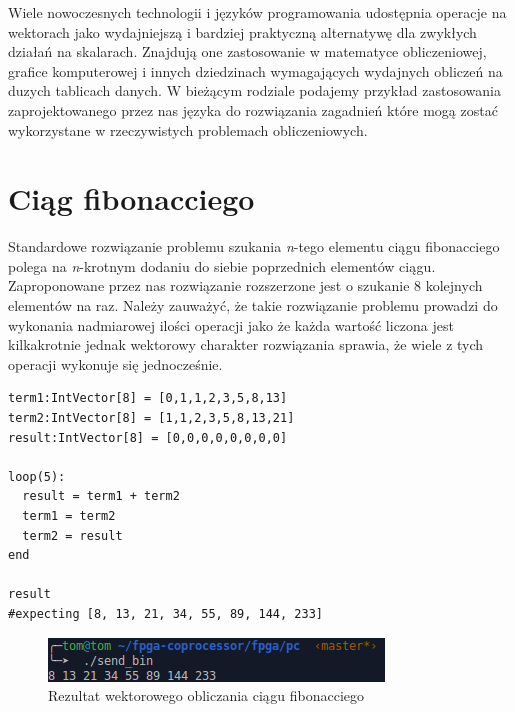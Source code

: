 Wiele nowoczesnych technologii i języków programowania udostępnia operacje na wektorach jako wydajniejszą i bardziej praktyczną alternatywę dla zwykłych działań na skalarach. Znajdują one zastosowanie w matematyce obliczeniowej, grafice komputerowej i innych dziedzinach wymagających wydajnych obliczeń na duzych tablicach danych. W bieżącym rodziale podajemy przykład zastosowania zaprojektowanego przez nas języka do rozwiązania zagadnień które mogą zostać wykorzystane w rzeczywistych problemach obliczeniowych.
\section{Ciąg fibonacciego}
Standardowe rozwiązanie problemu szukania \textit{n}-tego elementu ciągu fibonacciego polega na \textit{n}-krotnym dodaniu do siebie poprzednich elementów ciągu. Zaproponowane przez nas rozwiązanie rozszerzone jest o szukanie 8 kolejnych elementów na raz. Należy zauważyć, że takie rozwiązanie problemu prowadzi do wykonania nadmiarowej ilości operacji jako że każda wartość liczona jest kilkakrotnie jednak wektorowy charakter rozwiązania sprawia, że wiele z tych operacji wykonuje się jednocześnie.
\begin{lstlisting}[frame=single]
term1:IntVector[8] = [0,1,1,2,3,5,8,13]
term2:IntVector[8] = [1,1,2,3,5,8,13,21]
result:IntVector[8] = [0,0,0,0,0,0,0,0]

loop(5):
  result = term1 + term2
  term1 = term2
  term2 = result
end

result
#expecting [8, 13, 21, 34, 55, 89, 144, 233] 
\end{lstlisting}
\begin{figure}[!h]
\centering
\includegraphics[scale=1]{images/fibb}
\caption{Rezultat wektorowego obliczania ciągu fibonacciego}
\end{figure}
